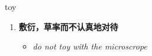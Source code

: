 
\begin{frame}
{\huge toy}
\begin{center}
\begin{enumerate}\Large
  \item \textbf{敷衍，草率而不认真地对待}
  \begin{itemize}
    \item \em{\Large{do not toy with the microscrope}}
  \end{itemize}
\end{enumerate}
\end{center}
\end{frame}
